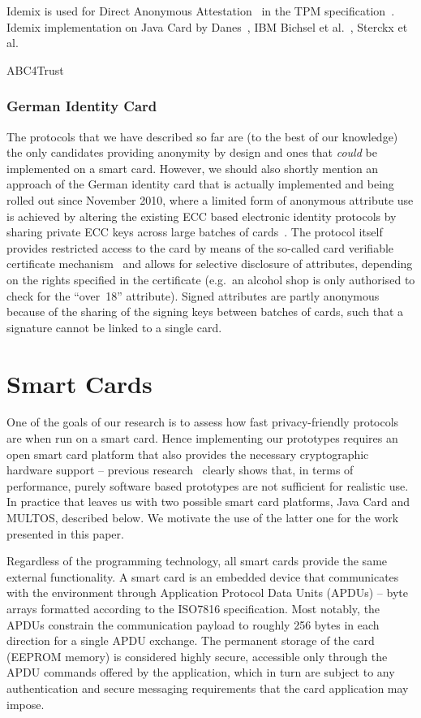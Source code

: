 Idemix is used for Direct Anonymous Attestation~\cite{BrickellCC2004} in the TPM
specification~\cite{TPM}.
Idemix implementation on Java Card by Danes~\cite{Danes}, IBM Bichsel et al.~\cite{BichselCGS2009}, Sterckx et al.~\cite{Sterckx09}

ABC4Trust

\subsubsection{German Identity Card}

The protocols that we have described so far are (to the best of our
knowledge) the only candidates providing anonymity by design and ones
that \emph{could} be implemented on a smart card. However, we should
also shortly mention an approach of the German identity card that is
actually implemented and being rolled out since November 2010, where a
limited form of anonymous attribute use is achieved by altering the
existing ECC based electronic identity protocols by sharing private ECC
keys across large batches of cards~\cite{Kugler2010}. The protocol itself
provides restricted access to the card by means of the so-called
card verifiable certificate mechanism~\cite{EAC20} and
allows for selective disclosure of attributes, depending on the rights
specified in the certificate (e.g.\ an alcohol shop is only authorised to check for
the ``over~18'' attribute). Signed attributes are partly anonymous
because of the sharing of the signing keys between batches of cards, such
that a signature cannot be linked to a single card.

\section{Smart Cards}

One of the goals of our research is to assess
how fast privacy-friendly protocols are when run on a smart card.
Hence implementing our prototypes requires an open smart card
platform that also provides the necessary cryptographic hardware
support -- previous research~\cite{TewsJacobs09} clearly shows
that, in terms of performance, purely software based prototypes are
not sufficient for realistic use. In practice that leaves us with
two possible smart card platforms, Java Card and MULTOS, described
below. We motivate the use of the latter one for the work presented
in this paper.

Regardless of the programming technology, all smart cards provide the
same external functionality. A smart card is an embedded device that
communicates with the environment through Application Protocol Data
Units (APDUs) -- byte arrays formatted according to the ISO7816
specification.  Most notably, the APDUs constrain the communication
payload to roughly 256 bytes in each direction for a single APDU exchange.
The permanent storage
of the card (EEPROM memory) is considered highly secure, accessible
only through the APDU commands offered by the application, which in
turn are subject to any authentication and secure messaging
requirements that the card application may impose.

